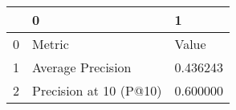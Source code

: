 \begin{tabular}{lll}
\toprule
 & 0 & 1 \\
\midrule
0 & Metric & Value \\
1 & Average Precision & 0.436243 \\
2 & Precision at 10 (P@10) & 0.600000 \\
\bottomrule
\end{tabular}
